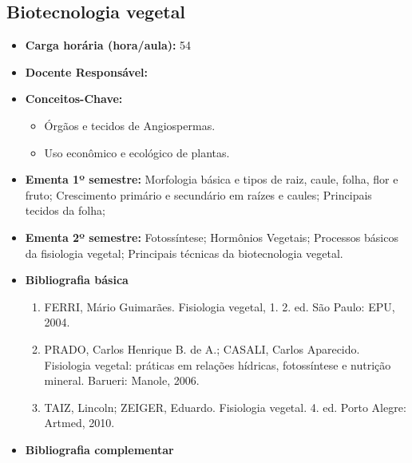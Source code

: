 \documentclass[11pt,fleqn]{book} %
\begin{document}
\subsection{Biotecnologia vegetal}\label{disc:biotecVegetal}
\begin{itemize}
	\item \textbf{Carga horária (hora/aula):} 54
	\item \textbf{Docente Responsável:}
	\item \textbf{Conceitos-Chave:}
	\begin{itemize}
		\item Órgãos e tecidos de Angiospermas.
		\item Uso econômico e ecológico de plantas. 
	\end{itemize}
	\item \textbf{Ementa 1º semestre:}
	Morfologia básica e tipos de raiz, caule, folha, flor e fruto; 
	Crescimento primário e secundário em raízes e caules; 
	Principais tecidos da folha;	
	\item \textbf{Ementa 2º semestre:}	
	Fotossíntese; 
	Hormônios Vegetais; 
	Processos básicos da fisiologia vegetal; 
	Principais técnicas da biotecnologia vegetal.
	\item \textbf{Bibliografia básica}
	\begin{enumerate}
		\item FERRI, Mário Guimarães. Fisiologia vegetal, 1. 2. ed. São Paulo: EPU, 2004. 
		\item PRADO, Carlos Henrique B. de A.; CASALI, Carlos Aparecido.  Fisiologia vegetal: práticas em relações hídricas, fotossíntese e nutrição mineral. Barueri: Manole, 2006.
		\item TAIZ, Lincoln; ZEIGER, Eduardo. Fisiologia vegetal. 4. ed. Porto Alegre: Artmed, 2010.
	\end{enumerate}
	\item \textbf{Bibliografia complementar}

\end{itemize}
\end{document}
